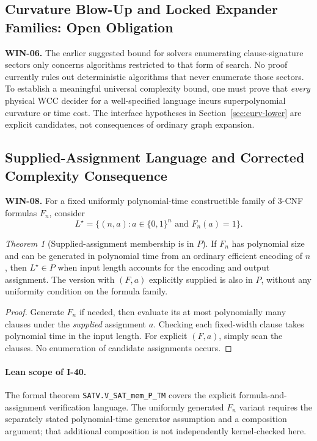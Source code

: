 \documentclass[12pt]{article}
\theoremstyle{remark}
\newtheorem{theorem}{Theorem}[section]
\begin{document}
\subsection{Curvature Blow-Up and Locked Expander Families: Open Obligation}
\noindent\textbf{WIN-06.}
The earlier suggested bound for solvers enumerating clause-signature
sectors only concerns algorithms restricted to that form of search.
No proof currently rules out deterministic algorithms that never
enumerate those sectors. To establish a meaningful universal
complexity bound, one must prove that \emph{every} physical WCC
decider for a well-specified language incurs superpolynomial
curvature or time cost. The interface hypotheses in
Section~\ref{sec:curv-lower} are explicit candidates, not consequences
of ordinary graph expansion.

\subsection{Supplied-Assignment Language and Corrected Complexity Consequence}
\label{sec:assignment-audit}
\noindent\textbf{WIN-08.}
For a fixed uniformly polynomial-time constructible family of
$3$-CNF formulas $F_n$, consider
\[
L^\star=\{(n,a):a\in\{0,1\}^n\text{ and }F_n(a)=1\}.
\]
\begin{theorem}[Supplied-assignment membership is in $P$]
\label{thm:supplied-assignment-in-P}
If $F_n$ has polynomial size and can be generated in polynomial
time from an ordinary efficient encoding of $n$, then
$L^\star\in P$ when input length accounts for the encoding and
output assignment. The version with $(F,a)$ explicitly supplied
is also in $P$, without any uniformity condition on the formula
family.
\end{theorem}
\begin{proof}
Generate $F_n$ if needed, then evaluate its at most polynomially
many clauses under the \emph{supplied} assignment $a$. Checking
each fixed-width clause takes polynomial time in the input length.
For explicit $(F,a)$, simply scan the clauses. No enumeration of
candidate assignments occurs.
\end{proof}
\paragraph{Lean scope of I-40.}
The formal theorem \nolinkurl{SATV.V_SAT_mem_P_TM}
covers the explicit formula-and-assignment verification
language.  The uniformly generated $F_n$ variant
requires the separately stated polynomial-time
generator assumption and a composition argument;
that additional composition is not independently
kernel-checked here.
\end{document}

